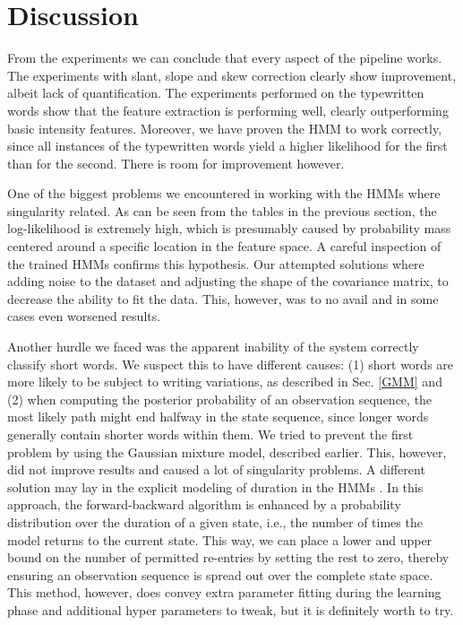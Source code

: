 \documentclass[conference]{IEEEtran}
\begin{document}
\section{Discussion} \label{discussion}
From the experiments we can conclude that every aspect of the pipeline works. The experiments with slant, slope and skew correction clearly show improvement, albeit lack of quantification. The experiments performed on the typewritten words show that the feature extraction is performing well, clearly outperforming basic intensity features. Moreover, we have proven the HMM to work correctly, since all instances of the typewritten words yield a higher likelihood for the first than for the second. There is room for improvement however.

One of the biggest problems we encountered in working with the HMMs where singularity related. As can be seen from the tables in the previous section, the log-likelihood is extremely high, which is presumably caused by probability mass centered around a specific location in the feature space. A careful inspection of the trained HMMs confirms this hypothesis. Our attempted solutions where adding noise to the dataset and adjusting the shape of the covariance matrix, to decrease the ability to fit the data. This, however, was to no avail and in some cases even worsened results.

Another hurdle we faced was the apparent inability of the system correctly classify short words. We suspect this to have different causes: (1) short words are more likely to be subject to writing variations, as described in Sec. \ref{GMM} and (2) when computing the posterior probability of an observation sequence, the most likely path might end halfway in the state sequence, since longer words generally contain shorter words within them. We tried to prevent the first problem by using the Gaussian mixture model, described earlier. This, however, did not improve results and caused a lot of singularity problems. A different solution may lay in the explicit modeling of duration in the HMMs \cite{conf/tsd/TothK05}\cite{journals/tsp/YuK06}. In this approach, the forward-backward algorithm is enhanced by a probability distribution over the duration of a given state, i.e., the number of times the model returns to the current state. This way, we can place a lower and upper bound on the number of permitted re-entries by setting the rest to zero, thereby ensuring an observation sequence is spread out over the complete state space. This method, however, does convey extra parameter fitting during the learning phase and additional hyper parameters to tweak, but it is definitely worth to try.
\end{document}
